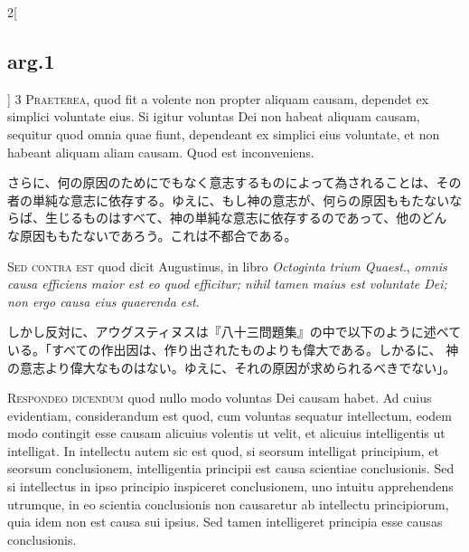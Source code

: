\documentclass[paper=a4paper,fontsize=10pt,jafontsize=9pt,titlepage]{jlreq}
\begin{document}
\begin{paracol}{2}[\subsection{arg.1}]
{\scshape 3 Praeterea}, quod fit a volente non propter
aliquam causam, dependet ex simplici voluntate eius. Si igitur voluntas
Dei non habeat aliquam causam, sequitur quod omnia quae fiunt,
dependeant ex simplici eius voluntate, et non habeant aliquam aliam
causam. Quod est inconveniens.

\switchcolumn

さらに、何の原因のためにでもなく意志するものによって為されることは、その
者の単純な意志に依存する。ゆえに、もし神の意志が、何らの原因ももたないな
 らば、生じるものはすべて、神の単純な意志に依存するのであって、他のどん
 な原因ももたないであろう。これは不都合である。

\switchcolumn*[\subsection{s.c.}]


{\scshape  Sed contra est} quod dicit Augustinus, in
libro {\itshape Octoginta trium Quaest}., {\itshape omnis causa efficiens maior est eo quod
efficitur; nihil tamen maius est voluntate Dei; non ergo causa eius
quaerenda est}.

\switchcolumn

しかし反対に、アウグスティヌスは『八十三問題集』の中で以下のように述べて
 いる。「すべての作出因は、作り出されたものよりも偉大である。しかるに、
 神の意志より偉大なものはない。ゆえに、それの原因が求められるべきでない」。



{\scshape Respondeo dicendum} quod nullo modo voluntas
Dei causam habet. Ad cuius evidentiam, considerandum est quod, cum
voluntas sequatur intellectum, eodem modo contingit esse causam alicuius
volentis ut velit, et alicuius intelligentis ut intelligat. In
intellectu autem sic est quod, si seorsum intelligat principium, et
seorsum conclusionem, intelligentia principii est causa scientiae
conclusionis. Sed si intellectus in ipso principio inspiceret
conclusionem, uno intuitu apprehendens utrumque, in eo scientia
conclusionis non causaretur ab intellectu principiorum, quia idem non
est causa sui ipsius. Sed tamen intelligeret principia esse causas
conclusionis.

\switchcolumn


\end{paracol}
\end{document}
